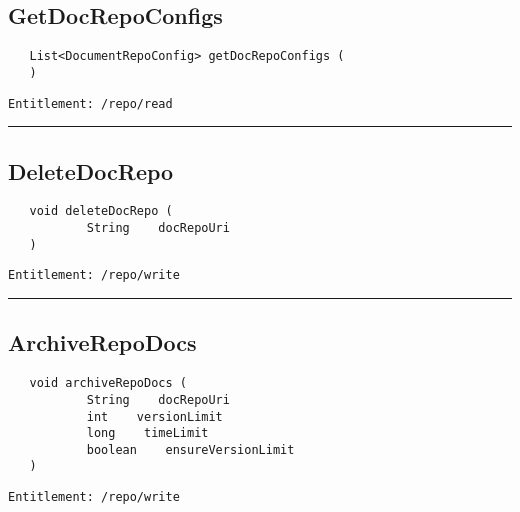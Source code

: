 \subsection{GetDocRepoConfigs}
\label{Api:GetDocRepoConfigs}
\begin{verbatim}
   List<DocumentRepoConfig> getDocRepoConfigs (
   )
\end{verbatim}
\begin{Verbatim}[fontsize=\small, formatcom=\color{Maroon}]
  Entitlement: /repo/read
\end{Verbatim}



\rule{12cm}{2pt}
\subsection{DeleteDocRepo}
\label{Api:DeleteDocRepo}
\begin{verbatim}
   void deleteDocRepo (
           String    docRepoUri
   )
\end{verbatim}
\begin{Verbatim}[fontsize=\small, formatcom=\color{Maroon}]
  Entitlement: /repo/write
\end{Verbatim}



\rule{12cm}{2pt}
\subsection{ArchiveRepoDocs}
\label{Api:ArchiveRepoDocs}
\begin{verbatim}
   void archiveRepoDocs (
           String    docRepoUri
           int    versionLimit
           long    timeLimit
           boolean    ensureVersionLimit
   )
\end{verbatim}
\begin{Verbatim}[fontsize=\small, formatcom=\color{Maroon}]
  Entitlement: /repo/write
\end{Verbatim}



